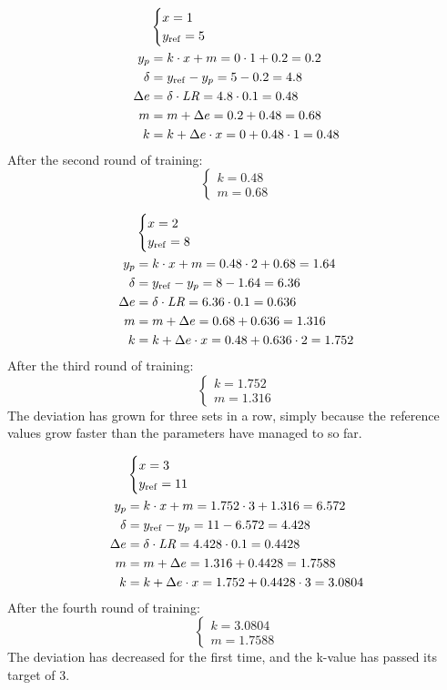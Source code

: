 \begin{align*}
  &\begin{cases} x = 1 \\ y_{\mathrm{ref}} = 5 \end{cases} \\
  y_{p} &= k \cdot x + m = 0 \cdot 1 + 0.2 = 0.2 \\
  \delta &= y_{\mathrm{ref}} - y_{p} = 5 - 0.2 = 4.8 \\
  \Delta e &= \delta \cdot \mathit{LR} = 4.8 \cdot 0.1 = 0.48 \\
  m &= m + \Delta e = 0.2 + 0.48 = 0.68 \\
  k &= k + \Delta e \cdot x = 0 + 0.48 \cdot 1 = 0.48
\end{align*}
After the second round of training:
\[
  \begin{cases} k = 0.48 \\ m = 0.68 \end{cases}
\]

\begin{align*}
  &\begin{cases} x = 2 \\ y_{\mathrm{ref}} = 8 \end{cases} \\
  y_{p} &= k \cdot x + m = 0.48 \cdot 2 + 0.68 = 1.64 \\
  \delta &= y_{\mathrm{ref}} - y_{p} = 8 - 1.64 = 6.36 \\
  \Delta e &= \delta \cdot \mathit{LR} = 6.36 \cdot 0.1 = 0.636 \\
  m &= m + \Delta e = 0.68 + 0.636 = 1.316 \\
  k &= k + \Delta e \cdot x = 0.48 + 0.636 \cdot 2 = 1.752
\end{align*}
After the third round of training:
\[
  \begin{cases} k = 1.752 \\ m = 1.316 \end{cases}
\]
The deviation has grown for three sets in a row, simply because the reference values grow faster
than the parameters have managed to so far.

\begin{align*}
  &\begin{cases} x = 3 \\ y_{\mathrm{ref}} = 11 \end{cases} \\
  y_{p} &= k \cdot x + m = 1.752 \cdot 3 + 1.316 = 6.572 \\
  \delta &= y_{\mathrm{ref}} - y_{p} = 11 - 6.572 = 4.428 \\
  \Delta e &= \delta \cdot \mathit{LR} = 4.428 \cdot 0.1 = 0.4428 \\
  m &= m + \Delta e = 1.316 + 0.4428 = 1.7588 \\
  k &= k + \Delta e \cdot x = 1.752 + 0.4428 \cdot 3 = 3.0804
\end{align*}
After the fourth round of training:
\[
  \begin{cases} k = 3.0804 \\ m = 1.7588 \end{cases}
\]
The deviation has decreased for the first time, and the k-value has passed its target of 3.

